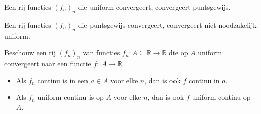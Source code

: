\documentclass[main.tex]{subfiles}
\begin{document}
\begin{st}
  \label{str:uniform-dan-puntsgewijs}
  Een rij functies $(f_{n})_{n}$ die uniform convergeert, convergeert puntsgewijs.
\end{st}

\begin{tvb}
  Een rij functies $(f_{n})_{n}$ die puntsgewijs convergeert, convergeert niet noodzakelijk uniform.
\end{tvb}

\begin{bst}
  Beschouw een rij $(f_{n})_{n}$ van functies $f_{n}: A \subseteq \mathbb{R} \rightarrow \mathbb{R}$ die op $A$ uniform convergeert naar een functie $f:\ A \rightarrow \mathbb{R}$.
  \begin{itemize}
  \item Als $f_{n}$ continu is in een $a\in A$ voor elke $n$, dan is ook $f$ continu in $a$.
  \item Als $f_{n}$ uniform continu is op $A$ voor elke $n$, dan is ook $f$ uniform continu op $A$. 
  \end{itemize}


\end{bst}
\end{document}
